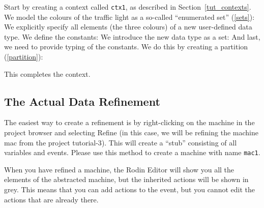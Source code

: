 Start by creating a context called \texttt{ctx1}, as described in Section~\ref{tut_contexts}.
We model the colours of the traffic light as a so-called ``enumerated set'' (\ref{sets}): 
We explicitly specify all elements (the three colours) of a new user-defined data type.
We define the constants:
We introduce the new data type as a set:
And last, we need to provide typing of the constants.  We do this by creating a partition (\ref{partition}):


This completes the context.

\subsection{The Actual Data Refinement}
\label{tut_actual_data_refinement}

The easiest way to create a refinement is by right-clicking on the machine in the project browser and selecting \textsf{Refine} (in this case, we will be refining the machine \textsf{mac} from the project \textsf{tutorial-3}).  This will create a ``stub'' consisting of all variables and events. Please use this method to create a machine with name \texttt{mac1}.

When you have refined a machine, the Rodin Editor will show you all the elements of the abstracted machine, but the inherited actions will be shown in grey. This means that you can add actions to the event, but you cannot edit the actions that are already there.

